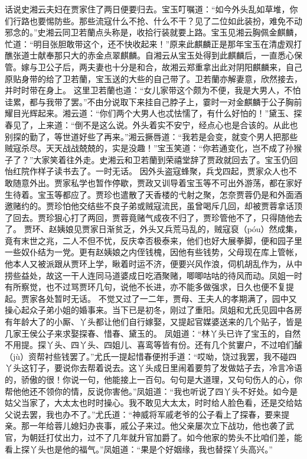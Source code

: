 \documentclass[12pt,oneside]{book}
\begin{document}
话说史湘云夫妇在贾家住了两日便要归去。宝玉叮嘱道：“如今外头乱如草堆，你们行路也要惕防些。那些流寇什么不抢、什么不干？见了二位如此装扮，难免不动邪念的。”史湘云同卫若蘭点头称是，收拾行装就要上路。宝玉见湘云胸佩金麒麟，忙道：“明目张胆敢带这个，还不快收起来！”原来此麒麟正是那年宝玉在清虚观打醮张道士献奉那只大的赤金点翠麒麟。自湘云从宝玉处得到此麒麟后，一直悉心保管。嫁与卫公子后，两夫妻也十分是和合，故湘云郑重拿出此对阴阳麒麟来，自己原贴身带的给了卫若蘭，宝玉送的大些的自己带了。卫若蘭亦解妻意，欣然接去，并时时带在身上。
这里卫若蘭也道：“女儿家带这个颇为不便，我是大男人，不怕诖累，都与我带了罢。”不由分说取下来挂自己脖子上，霎时一对金麒麟于公子胸前耀目光辉起来。湘云道：“你们两个大男人也忒怯懦了，有什么好怕的！”黛玉、探春见了，上来道：“倒不是这么说。外头着实不安宁，经点心也是合该的。从此也别探的勤了，等世道好些了再来。”湘云撅唇道：“我若是会变，就变个男人把那些贼寇杀尽。天天战战兢兢的，实是没趣！”宝玉笑道：“你若通变化，岂不成了孙猴子了？”大家笑着往外走。史湘云和卫若蘭到荣禧堂辞了贾政就回去了。宝玉仍回怡红院作样子读书去了。一时无话。
因外头盗寇蜂聚，兵戈四起，贾家众人也不敢随意外出。贾家私学也暂作停歇，贾政又训导着宝玉等不可出外游荡，都在家好生待着。宝玉等都应了。贾珍也遣散了天香楼的弋射之聚，怎奈贾蓉仍是和外面酒邀赌约的。贾珍怕他交结些不良子弟或贼寇流民，虽曾喝斥几回，却被贾蓉拿话顶了回去。贾珍狠心打了两回，贾蓉竟赌气成夜不归了，贾珍管他不了，只得随他去了。
贾环、赵姨娘见贾家日渐贫乏，外头又兵荒马乱的，贼寇裒（póu）然成集，竟有末世之兆，二人不但不忧，反庆幸否极泰来，他们也好大展拳脚，便和园子里一些奴仆结为一党。更有赵姨娘之内侄钱槐，因他有些钱势，父母现在库上管帐，他本人又被派跟从贾环上学，瞅着时运不济，便要兴风作浪，伺机胡乱作为，从中捞些益处，故这一干人连同马道婆成日吃酒聚赌，唧唧咕咕的待风而动。凤姐一时有所察觉，也不过骂贾环几句，说他不长进，亦不能多做强求，日久也便不复提起。贾家各处暂时无话。
不觉又过了一二年，贾母、王夫人的孝期满了，园中又操心起众子弟小姐的婚事来。当下已是初冬，刚过了重阳。凤姐和尤氏见园中各房有年龄大了的小厮、丫头都让他们自行嫁娶，又提起官媒婆送来的几个贴子，皆是几家王侯公子来求娶探春、惜春、黛玉的。
凤姐道：“林丫头已许了宝玉的，自然不用提。探丫头、四丫头、四姐儿、喜鸾等皆有份。还有几个贫寠户，不过咱们醵（jù）资帮衬些钱罢了。”尤氏一提起惜春便拊手道：“哎呦，饶过我罢，我不碰四丫头这钉子，要说你去帮着说去。这丫头成日里闹着要剪了发做姑子去，冷言冷语的，骄傲的很！你说一句，他能接上一百句。句句是大道理，又句句伤人的心，你帮他他还不领你的情，反说你害他。”凤姐道：“我也听说了四丫头不好处。如今是姑父当家了，大太太也时时操心。我不敢见大太太，时时给人脸色看，还是交给姑父说去罢，我也办不了。”尤氏道：“神威将军戚老爷的公子看上了探春，要来提亲。那一年给蓉儿媳妇办丧事，戚公子来过。他父亲屡次立下战功，他也袭了武官，为朝廷打仗出力，过不了几年就升官加爵了。如今他家的势头不比咱们差，能看上探丫头也是他的福气。”凤姐道：“果是个好姻缘，我也替探丫头高兴。”
\end{document}

